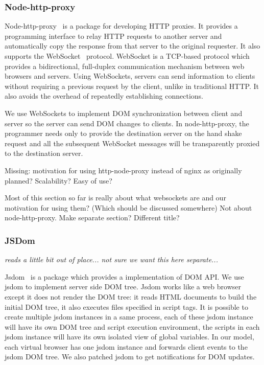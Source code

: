 \subsubsection{Node-http-proxy}

Node-http-proxy~\cite{nodeproxy} is a \nodejs package for developing HTTP proxies.
It provides a programming interface to relay HTTP requests to another server and
automatically copy the response from that server to the original requester.
It also supports the WebSocket~\cite{rfc6455} protocol.
WebSocket is a TCP-based protocol which provides a bidirectional, full-duplex 
communication mechanism between web browsers and servers.
Using WebSockets, servers can send information to clients without requiring
a previous request by the client, unlike in traditional HTTP.
It also avoids the overhead of repeatedly establishing connections.

We use WebSockets to implement DOM synchronization between client and server so
the server can send DOM changes to clients.  In node-http-proxy,
the programmer needs only to provide the destination server on the hand shake
request and all the subsequent WebSocket messages will
be transparently proxied to the destination server.


Missing: motivation for using http-node-proxy instead of nginx as originally
planned?  Scalability? Easy of use?

Most of this section so far is really about what websockets are and our motivation
for using them? (Which should be discussed somewhere) 
Not about node-http-proxy.  Make separate section?  Different title?

\subsubsection{JSDom}

\emph{reads a little bit out of place... not sure we want this here separate...}

Jsdom~\cite{JSDOM} is a \nodejs package which provides a \js implementation of 
DOM API. We use jsdom to implement server side DOM tree.
Jsdom works like a web browser except it does not render the DOM tree:
it reads HTML documents to build the initial DOM tree,
it also executes \js files specified in script tags.
It is possible to create multiple jsdom instances in a same process,
each of these jsdom instance will have its own DOM tree and
script execution environment,
the scripts in each jsdom instance will have its own isolated view of global variables.
In our model, each virtual browser has one jsdom instance and
forwards client events to the jsdom DOM tree.
We also patched jsdom to get notifications for DOM updates.


